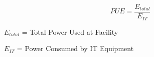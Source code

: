     \begin{equation} \label{eq:pue}
    PUE=\frac{E_{total}}{E_{IT}} 
    \end{equation}
    \begin{center}
    $E_{total}$ = Total Power Used at Facility
    
    $E_{IT}$ = Power Consumed by IT Equipment
    \end{center}
    \vspace{.2cm}
    